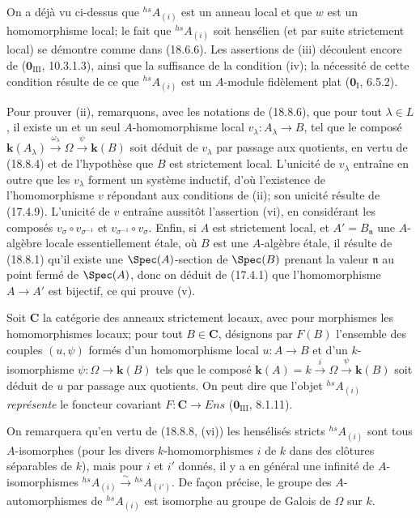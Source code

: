 On a déjà vu ci-dessus que ${}^{hs}\!A_{(i)}$ est un anneau local et que $w$ est un homomorphisme local; le fait que ${}^{hs}\!A_{(i)}$ soit hensélien (et par suite strictement local) se démontre comme dans (18.6.6). Les assertions de (iii) découlent encore de ($\mathbf{0}_{\mathrm{III}}$, 10.3.1.3), ainsi que la suffisance de la condition (iv); la nécessité de cette condition résulte de ce que ${}^{hs}\!A_{(i)}$ est un $A$-module fidèlement plat ($\mathbf{0}_{\mathrm I}$, 6.5.2).

Pour prouver (ii), remarquons, avec les notations de (18.8.6), que pour tout $\lambda\in L$, il existe un et un seul $A$-homomorphisme local $v_\lambda:A_\lambda\to B$, tel que le composé $\boldsymbol{k}(A_\lambda)\xrightarrow{\omega_\lambda}\Omega\xrightarrow{\psi}\boldsymbol{k}(B)$ soit déduit de $v_\lambda$ par passage aux quotients, en vertu de (18.8.4) et de l'hypothèse que $B$ est strictement local. L'unicité de $v_\lambda$ entraîne en outre que les $v_\lambda$ forment un système inductif, d'où l'existence de l'homomorphisme $v$ répondant aux conditions de (ii); son unicité résulte de (17.4.9). L'unicité de $v$ entraîne aussitôt l'assertion (vi), en considérant les composés $v_\sigma\circ v_{\sigma^{-1}}$ et $v_{\sigma^{-1}}\circ v_\sigma$. Enfin, si $A$ est strictement local, et $A'=B_{\mathfrak n}$ une $A$-algèbre locale essentiellement étale, où $B$ est une $A$-algèbre étale, il résulte de (18.8.1) qu'il existe une $\Spec(A)$-section de $\Spec(B)$ prenant la valeur $\mathfrak n$ au point fermé de $\Spec(A)$, donc on déduit de (17.4.1) que l'homomorphisme $A\to A'$ est bijectif, ce qui prouve (v).

\begin{env}[18.8.8.1]
\label{IV.18.8.8.1}
Soit $\boldsymbol{C}$ la catégorie des anneaux strictement locaux, avec pour morphismes les homomorphismes locaux; pour tout $B\in\boldsymbol{C}$, désignons par $F(B)$ l'ensemble des couples $(u,\psi)$ formés d'un homomorphisme local $u:A\to B$ et d'un $k$-isomorphisme $\psi:\Omega\to\boldsymbol{k}(B)$ tels que le composé $\boldsymbol{k}(A)=k\xrightarrow{i}\Omega\xrightarrow{\psi}\boldsymbol{k}(B)$ soit déduit de $u$ par passage aux quotients. On peut dire que l'objet ${}^{hs}\!A_{(i)}$ \emph{représente} le foncteur covariant $F:\boldsymbol{C}\to\boldsymbol{\mathit{Ens}}$ ($\mathbf{0}_{\mathrm{III}}$, 8.1.11).

On remarquera qu'en vertu de (18.8.8, (vi)) les hensélisés stricts ${}^{hs}\!A_{(i)}$ sont tous $A$-isomorphes (pour les divers $k$-homomorphismes $i$ de $k$ dans des clôtures séparables de $k$), mais pour $i$ et $i'$ donnés, il y a en général une infinité de $A$-isomorphismes ${}^{hs}\!A_{(i)}\xrightarrow{\sim}{}^{hs}\!A_{(i')}$. De façon précise, le groupe des $A$-automorphismes de ${}^{hs}\!A_{(i)}$ est isomorphe au groupe de Galois de $\Omega$ sur $k$.
\end{env}

